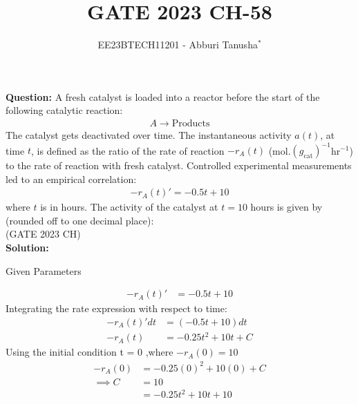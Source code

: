 \documentclass[journal,12pt,twocolumn]{IEEEtran}
\theoremstyle{remark}
\begin{document}

\vspace{3cm}

\title{GATE 2023 CH-58}
\author{EE23BTECH11201 - Abburi Tanusha$^{*}$%
}
\maketitle
\newpage
\bigskip

\renewcommand{\thefigure}{\theenumi}
\renewcommand{\thetable}{\theenumi}

\vspace{3cm}

\maketitle
\textbf{Question:} 
A fresh catalyst is loaded into a reactor before the start of the following catalytic reaction:
\begin{align*}
  A \rightarrow \text{Products} 
\end{align*}
The catalyst gets deactivated over time. The instantaneous activity $a(t)$, at time $t$, is defined as the ratio of the rate of reaction $-r_A(t)$ (mol.$(g_{\text{cat}})^{-1}$hr$^{-1}$) to the rate of reaction with fresh catalyst. Controlled experimental measurements led to an empirical correlation:
\begin{align*}
 -r_A(t)' = -0.5t + 10
 \end{align*}
where $t$ is in hours.
The activity of the catalyst at $t=10$ hours is given by (rounded off to one decimal place):\\
\hfill(GATE 2023 CH)\\
\textbf{Solution:} 
\begin{table}[h!]
\centering
\resizebox{6cm}{!}{

}
\caption{Given Parameters}
\label{tab:my_label}
\end{table}
\begin{align}
 -r_A(t)' &= -0.5t + 10 
 \end{align}
Integrating the rate expression with respect to time:
\begin{align}
 -r_A(t)' dt &= (-0.5t + 10) dt \\
 -r_A(t) &= -0.25t^2 + 10t + C 
 \end{align}
Using the initial condition t = 0 ,where $-r_A(0) = 10$ \\
\begin{align}
 -r_A(0) &= -0.25(0)^2 + 10(0) + C \\
 \implies C &=10\\
 &= -0.25t^2 + 10t + 10 
 \end{align}
\end{document}
